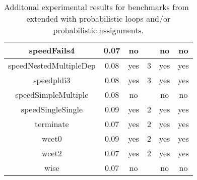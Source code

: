 \begin{center}
\begin{table}[]
\begin{tabular}{c|c|c|c|c|c}
{speedFails4} & {0.07} & {no} & {} & {no} & {no} \\\hline
{speedNestedMultipleDep} & {0.08} & {yes} & {3} & {yes} & {yes} \\\hline
{speedpldi3} & {0.08} & {yes} & {3} & {yes} & {yes} \\\hline
{speedSimpleMultiple} & {0.08} & {no} & {} & {no} & {no} \\\hline
{speedSingleSingle} & {0.09} & {yes} & {2} & {yes} & {yes} \\\hline
{terminate} & {0.07} & {yes} & {2} & {yes} & {yes} \\\hline
{wcet0} & {0.09} & {yes} & {2} & {yes} & {yes} \\\hline
{wcet2} & {0.07} & {yes} & {2} & {yes} & {yes} \\\hline
{wise} & {0.07} & {no} & {} & {no} & {no} \\\hline 
    \end{tabular}
    \caption{Additonal experimental results for benchmarks from~\cite{ADFG10:lexicographic} extended with probabilistic loops and/or probabilistic assignments.}
    \label{tab:exp3}
\end{table}
\end{center}


